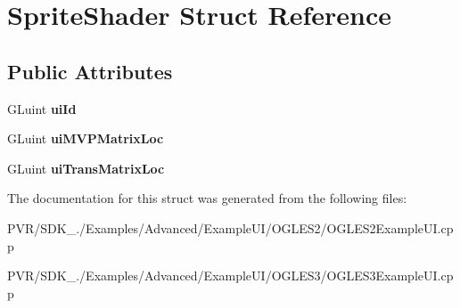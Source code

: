\hypertarget{struct_sprite_shader}{\section{Sprite\+Shader Struct Reference}
\label{struct_sprite_shader}
}
\subsection*{Public Attributes}
\begin{DoxyCompactItemize}
\item 
\hypertarget{struct_sprite_shader_a1f854d622ff7753b830266e58c9dad64}{G\+Luint {\bfseries ui\+Id}}\label{struct_sprite_shader_a1f854d622ff7753b830266e58c9dad64}

\item 
\hypertarget{struct_sprite_shader_aff1f9103565b9e9b19a96a6e76d3b76e}{G\+Luint {\bfseries ui\+M\+V\+P\+Matrix\+Loc}}\label{struct_sprite_shader_aff1f9103565b9e9b19a96a6e76d3b76e}

\item 
\hypertarget{struct_sprite_shader_aee8e8deb91e6a180a76c52d40f9f4018}{G\+Luint {\bfseries ui\+Trans\+Matrix\+Loc}}\label{struct_sprite_shader_aee8e8deb91e6a180a76c52d40f9f4018}

\end{DoxyCompactItemize}


The documentation for this struct was generated from the following files\+:\begin{DoxyCompactItemize}
\item 
P\+V\+R/\+S\+D\+K\+\_./\+Examples/\+Advanced/\+Example\+U\+I/\+O\+G\+L\+E\+S2/O\+G\+L\+E\+S2\+Example\+U\+I.\+cpp\item 
P\+V\+R/\+S\+D\+K\+\_./\+Examples/\+Advanced/\+Example\+U\+I/\+O\+G\+L\+E\+S3/O\+G\+L\+E\+S3\+Example\+U\+I.\+cpp\end{DoxyCompactItemize}
